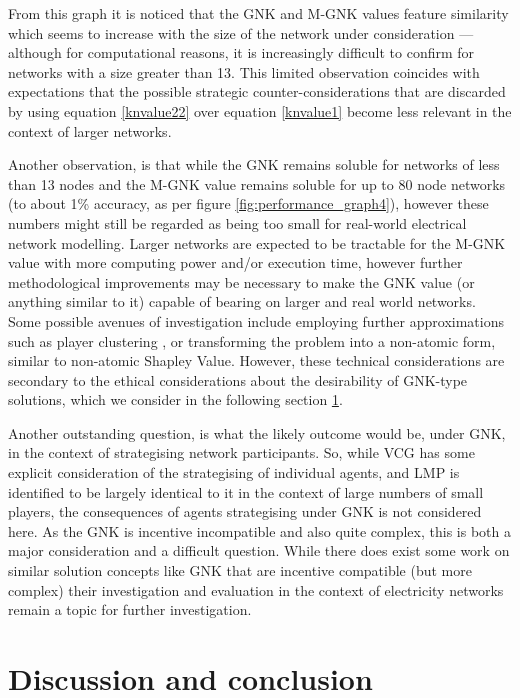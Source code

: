 From this graph it is noticed that the GNK and M-GNK values feature similarity which seems to increase with the size of the network under consideration --- although for computational reasons, it is increasingly difficult to confirm for networks with a size greater than 13.
This limited observation coincides with expectations that the possible strategic counter-considerations that are discarded by using equation \ref{knvalue22} over equation \ref{knvalue1} become less relevant in the context of larger networks.

Another observation, is that while the GNK remains soluble for networks of less than 13 nodes and the M-GNK value remains soluble for up to 80 node networks (to about 1\% accuracy, as per figure \ref{fig:performance_graph4}), however these numbers might still be regarded as being too small for real-world electrical network modelling.
Larger networks are expected to be tractable for the M-GNK value with more computing power and/or execution time, however further methodological improvements may be necessary to make the GNK value (or anything similar to it) capable of bearing on larger and real world networks.
Some possible avenues of investigation include employing further approximations such as player clustering \cite{DBLP:journals/corr/abs-1903-10965}, or transforming the problem into a non-atomic form, similar to non-atomic Shapley Value.
However, these technical considerations are secondary to the ethical considerations about the desirability of GNK-type solutions, which we consider in the following section \ref{sec:GNK_value_discussion}.

Another outstanding question, is what the likely outcome would be, under GNK, in the context of strategising network participants.
So, while VCG has some explicit consideration of the strategising of individual agents, and LMP is identified to be largely identical to it in the context of large numbers of small players, the consequences of agents strategising under GNK is not considered here.
As the GNK is incentive incompatible and also quite complex, this is both a major consideration and a difficult question.
While there does exist some work on similar solution concepts like GNK that are incentive compatible (but more complex) \cite{myerson1,Salamanca2019} their investigation and evaluation in the context of electricity networks remain a topic for further investigation.




\section{Discussion and conclusion}\label{sec:GNK_value_discussion}

